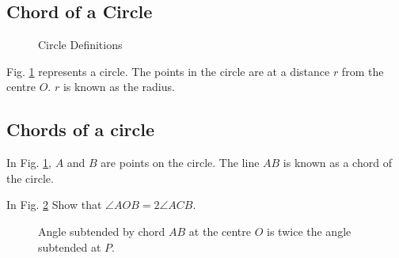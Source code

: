 \subsection{Chord of a Circle}

\begin{figure}[!ht]
	\begin{center}
		
		\resizebox{\columnwidth}{!}{}
	\end{center}
	\caption{Circle Definitions}
	\label{ch4_circle_def}	
\end{figure}
\begin{definition}
	Fig. \ref{ch4_circle_def} represents a circle.  The points in the circle are at a distance $r$ from the centre $O$.  $r$ is known as the radius.
\end{definition}

\subsection{Chords of a circle}
\begin{definition}
	In Fig. \ref{ch4_circle_def}, $A$ and $B$ are points on the circle.  The line $AB$ is known as a chord of the circle.
\end{definition}
%
%
\begin{problem}
	\label{ch4_prob_circle_subtend}
	In Fig. \ref{ch4_circle_subtend}  Show that $\angle AOB = 2\angle ACB $.
\end{problem}
\begin{figure}[!ht]
	\begin{center}
		
		\resizebox{\columnwidth}{!}{}
	\end{center}
	\caption{Angle subtended by chord $AB$ at the centre $O$ is twice the angle subtended at $P$. }
	\label{ch4_circle_subtend}	
\end{figure}

